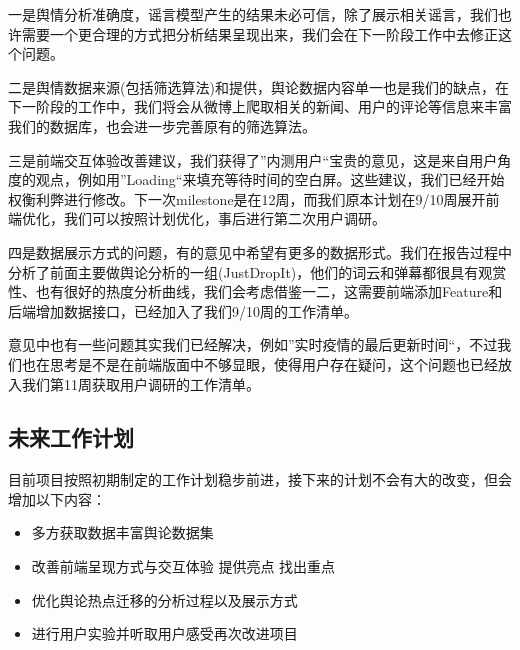 \documentclass{article}
\begin{document}
一是舆情分析准确度，谣言模型产生的结果未必可信，除了展示相关谣言，我们也许需要一个更合理的方式把分析结果呈现出来，我们会在下一阶段工作中去修正这个问题。

二是舆情数据来源(包括筛选算法)和提供，舆论数据内容单一也是我们的缺点，在下一阶段的工作中，我们将会从微博上爬取相关的新闻、用户的评论等信息来丰富我们的数据库，也会进一步完善原有的筛选算法。

三是前端交互体验改善建议，我们获得了”内测用户“宝贵的意见，这是来自用户角度的观点，例如用”Loading“来填充等待时间的空白屏。这些建议，我们已经开始权衡利弊进行修改。下一次milestone是在12周，而我们原本计划在9/10周展开前端优化，我们可以按照计划优化，事后进行第二次用户调研。

四是数据展示方式的问题，有的意见中希望有更多的数据形式。我们在报告过程中分析了前面主要做舆论分析的一组(JustDropIt)，他们的词云和弹幕都很具有观赏性、也有很好的热度分析曲线，我们会考虑借鉴一二，这需要前端添加Feature和后端增加数据接口，已经加入了我们9/10周的工作清单。

意见中也有一些问题其实我们已经解决，例如”实时疫情的最后更新时间“，不过我们也在思考是不是在前端版面中不够显眼，使得用户存在疑问，这个问题也已经放入我们第11周获取用户调研的工作清单。

\subsection{未来工作计划}
目前项目按照初期制定的工作计划稳步前进，接下来的计划不会有大的改变，但会增加以下内容：
\begin{itemize}
	\item{多方获取数据丰富舆论数据集}
	\item{改善前端呈现方式与交互体验 提供亮点 找出重点}
	\item{优化舆论热点迁移的分析过程以及展示方式}
	\item{进行用户实验并听取用户感受再次改进项目}
\end{itemize}
\end{document}
